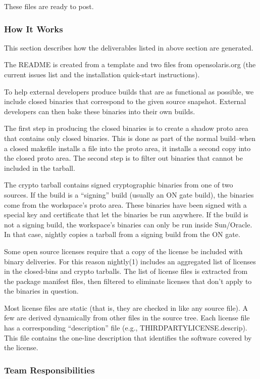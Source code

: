 \documentclass{article}
\begin{document}
  These files are ready to post.

\subsubsection*{How It Works}

This section describes how the deliverables listed in above section are
generated.

The README is created from a template and two files from opensolaris.org (the
current issues list and the installation quick-start instructions).

To help external developers produce builds that are as functional as possible,
we include closed binaries that correspond to the given source snapshot.
External developers can then bake these binaries into their own builds.

The first step in producing the closed binaries is to create a shadow proto area
that contains only closed binaries.  This is done as part of the normal
build--when a closed makefile installs a file into the proto area, it installs a
second copy into the closed proto area.  The second step is to filter out
binaries that cannot be included in the tarball.

The crypto tarball contains signed cryptographic binaries from one of two
sources.  If the build is a ``signing'' build (usually an ON gate build), the
binaries come from the workspace's proto area.  These binaries have been signed
with a special key and certificate that let the binaries be run anywhere.  If
the build is not a signing build, the workspace's binaries can only be run
inside Sun/Oracle.  In that case, nightly copies a tarball from a signing build
from the ON gate.

Some open source licenses require that a copy of the license be included with
binary deliveries.  For this reason nightly(1) includes an aggregated list of
licenses in the closed-bins and crypto tarballs.  The list of license files is
extracted from the package manifest files, then filtered to eliminate licenses
that don't apply to the binaries in question.

Most license files are static (that is, they are checked in like any source
file).  A few are derived dynamically from other files in the source tree.  Each
license file has a corresponding ``description'' file (e.g.,
THIRDPARTYLICENSE.descrip).  This file contains the one-line description that
identifies the software covered by the license.

\subsubsection*{Team Responsibilities}
\end{document}
